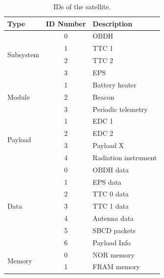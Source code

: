 \begin{table}[ht]
	\centering
	\begin{tabular}{lcl}
		\toprule[1.5pt]
		\textbf{Type}              & \textbf{ID Number} & \textbf{Description} \\
		\midrule
		\multirow{4}{*}{Subsystem} & 0                  & OBDH                 \\
		                           & 1                  & TTC 1                \\
		                           & 2                  & TTC 2                \\
		                           & 3                  & EPS                  \\
		\midrule
		\multirow{3}{*}{Module}    & 1                  & Battery heater       \\
		                           & 2                  & Beacon               \\
		                           & 3                  & Periodic telemetry   \\
		\midrule
		\multirow{4}{*}{Payload}   & 1                  & EDC 1                \\
		                           & 2                  & EDC 2                \\
		                           & 3                  & Payload X            \\
		                           & 4                  & Radiation instrument \\
		\midrule
		\multirow{7}{*}{Data}      & 0                  & OBDH data            \\
		                           & 1                  & EPS data             \\
		                           & 2                  & TTC 0 data           \\
		                           & 3                  & TTC 1 data           \\
		                           & 4                  & Antenna data         \\
		                           & 5                  & SBCD packets         \\
		                           & 6                  & Payload Info         \\
		\midrule
		\multirow{2}{*}{Memory}    & 0                  & NOR memory            \\
		                           & 1                  & FRAM memory           \\
		\bottomrule[1.5pt]
	\end{tabular}
	\caption{IDs of the satellite.}
	\label{tab:system-ids}
\end{table}

